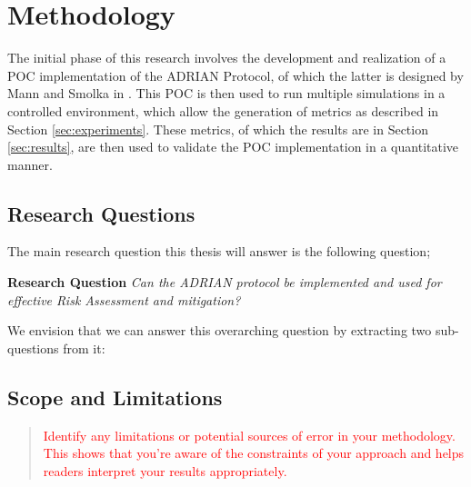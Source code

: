 \section{Methodology}
\label{sec:methodology}
The initial phase of this research involves the development and realization of a POC implementation of the ADRIAN Protocol, of which the latter is designed by Mann and Smolka in \cite{mann2023ADRIAN}. This POC is then used to run multiple simulations in a controlled environment, which allow the generation of metrics as described in Section \ref{sec:experiments}. These metrics, of which the results are in Section \ref{sec:results}, are then used to validate the POC implementation in a quantitative manner. 


\subsection{Research Questions}
\label{ssec:research-questions}

The main research question this thesis will answer is the following question;

\vspace{0.5em}
\textbf{Research Question}\label{rq} \emph{Can the ADRIAN protocol be implemented and used for effective Risk Assessment and mitigation?}\vspace{1em}

We envision that we can answer this overarching question by extracting two sub-questions from it:



\subsection{Scope and Limitations}
\label{ssec:scope-limitations}
\begin{quote}\textcolor{red}{
    Identify any limitations or potential sources of error in your methodology. This shows that you're aware of the constraints of your approach and helps readers interpret your results appropriately.
}\end{quote}
